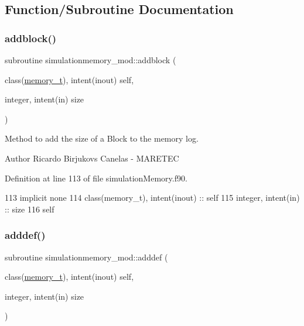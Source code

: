 \subsection{Function/\+Subroutine Documentation}
\mbox{\label{namespacesimulationmemory__mod_a2ade4b86d68e8daa4f22e1cdf7473e2c}} 
\subsubsection{\texorpdfstring{addblock()}{addblock()}}
{\footnotesize\ttfamily subroutine simulationmemory\+\_\+mod\+::addblock (\begin{DoxyParamCaption}\item[{class(\mbox{\hyperlink{structsimulationmemory__mod_1_1memory__t}{memory\+\_\+t}}), intent(inout)}]{self,  }\item[{integer, intent(in)}]{size }\end{DoxyParamCaption})\hspace{0.3cm}{\ttfamily [private]}}



Method to add the size of a Block to the memory log. 

\begin{DoxyAuthor}{Author}
Ricardo Birjukovs Canelas -\/ M\+A\+R\+E\+T\+EC 
\end{DoxyAuthor}


Definition at line 113 of file simulation\+Memory.\+f90.


\begin{DoxyCode}
113     \textcolor{keywordtype}{implicit none}
114     \textcolor{keywordtype}{class}(memory\_t), \textcolor{keywordtype}{intent(inout)} :: self
115     \textcolor{keywordtype}{integer}, \textcolor{keywordtype}{intent(in)} :: size
116     self%
\end{DoxyCode}
\mbox{\label{namespacesimulationmemory__mod_a0812b4222f930cfb142586f47b2de0da}} 
\subsubsection{\texorpdfstring{adddef()}{adddef()}}
{\footnotesize\ttfamily subroutine simulationmemory\+\_\+mod\+::adddef (\begin{DoxyParamCaption}\item[{class(\mbox{\hyperlink{structsimulationmemory__mod_1_1memory__t}{memory\+\_\+t}}), intent(inout)}]{self,  }\item[{integer, intent(in)}]{size }\end{DoxyParamCaption})\hspace{0.3cm}{\ttfamily [private]}}



